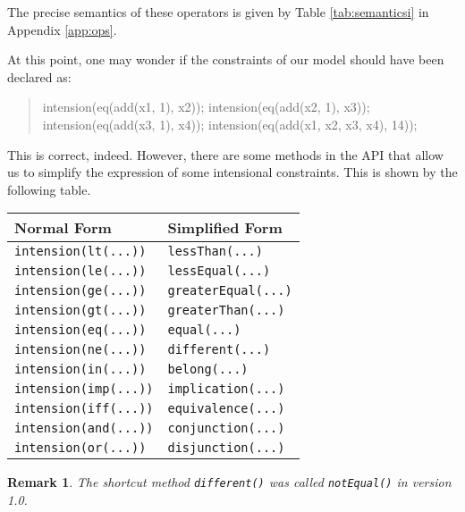 \documentclass[10pt]{article}
\newtheorem{remark}{Remark}
\newcommand{\nn}[1]{{\tt #1}} %
\newenvironment{myvb}{\endgraf\small\verbatim}{\endverbatim}
\begin{document}
The precise semantics of these operators is given by Table \ref{tab:semanticsi} in Appendix \ref{app:ops}.


At this point, one may wonder if the constraints of our model should have been declared as:

\begin{quote}
\begin{myvb}
intension(eq(add(x1, 1), x2));
intension(eq(add(x2, 1), x3));
intension(eq(add(x3, 1), x4));
intension(eq(add(x1, x2, x3, x4), 14));
\end{myvb}
\end{quote}

This is correct, indeed.
However, there are some methods in the API that allow us to simplify the expression of some intensional constraints.
This is shown by the following table.

\medskip\begin{tabular}{ll}
  \toprule
Normal Form & Simplified Form \\
  \midrule
  \verb!intension(lt(...))! & \verb!lessThan(...)!  \\
  \verb!intension(le(...))! & \verb!lessEqual(...)!  \\
  \verb!intension(ge(...))! & \verb!greaterEqual(...)!  \\
  \verb!intension(gt(...))! & \verb!greaterThan(...)!  \\
  \verb!intension(eq(...))! & \verb!equal(...)!  \\
  \verb!intension(ne(...))! & \verb!different(...)!  \\
  \verb!intension(in(...))! & \verb!belong(...)!  \\
  \verb!intension(imp(...))! & \verb!implication(...)!  \\
  \verb!intension(iff(...))! & \verb!equivalence(...)!  \\
  \verb!intension(and(...))! & \verb!conjunction(...)!  \\
  \verb!intension(or(...))! & \verb!disjunction(...)!  \\
\bottomrule
\end{tabular}
\bigskip


\begin{remark}
  The shortcut method \nn{different()} was called  \nn{notEqual()} in version 1.0.
\end{remark}
\end{document}
